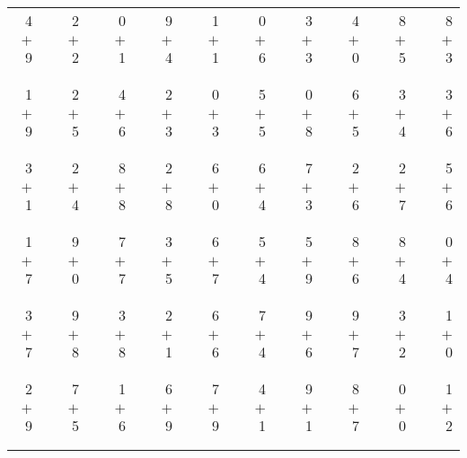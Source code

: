 \documentclass[12pt, letterpaper]{article}
\begin{document}
\begin{tabular}{rrrrrrrrrrrrrrrrrrr}
4 & & 2 & & 0 & & 9 & & 1 & & 0 & & 3 & & 4 & & 8 & & 8\\
$+$ 9 & & $+$ 2 & & $+$ 1 & & $+$ 4 & & $+$ 1 & & $+$ 6 & & $+$ 3 & & $+$ 0 & & $+$ 5 & & $+$ 3\\
\cline{1-1} \cline{3-3} \cline{5-5} \cline{7-7} \cline{9-9} \cline{11-11} \cline{13-13} \cline{15-15} \cline{17-17} \cline{19-19} \\ \\
1 & & 2 & & 4 & & 2 & & 0 & & 5 & & 0 & & 6 & & 3 & & 3\\
$+$ 9 & & $+$ 5 & & $+$ 6 & & $+$ 3 & & $+$ 3 & & $+$ 5 & & $+$ 8 & & $+$ 5 & & $+$ 4 & & $+$ 6\\
\cline{1-1} \cline{3-3} \cline{5-5} \cline{7-7} \cline{9-9} \cline{11-11} \cline{13-13} \cline{15-15} \cline{17-17} \cline{19-19} \\ \\
3 & & 2 & & 8 & & 2 & & 6 & & 6 & & 7 & & 2 & & 2 & & 5\\
$+$ 1 & & $+$ 4 & & $+$ 8 & & $+$ 8 & & $+$ 0 & & $+$ 4 & & $+$ 3 & & $+$ 6 & & $+$ 7 & & $+$ 6\\
\cline{1-1} \cline{3-3} \cline{5-5} \cline{7-7} \cline{9-9} \cline{11-11} \cline{13-13} \cline{15-15} \cline{17-17} \cline{19-19} \\ \\
1 & & 9 & & 7 & & 3 & & 6 & & 5 & & 5 & & 8 & & 8 & & 0\\
$+$ 7 & & $+$ 0 & & $+$ 7 & & $+$ 5 & & $+$ 7 & & $+$ 4 & & $+$ 9 & & $+$ 6 & & $+$ 4 & & $+$ 4\\
\cline{1-1} \cline{3-3} \cline{5-5} \cline{7-7} \cline{9-9} \cline{11-11} \cline{13-13} \cline{15-15} \cline{17-17} \cline{19-19} \\ \\
3 & & 9 & & 3 & & 2 & & 6 & & 7 & & 9 & & 9 & & 3 & & 1\\
$+$ 7 & & $+$ 8 & & $+$ 8 & & $+$ 1 & & $+$ 6 & & $+$ 4 & & $+$ 6 & & $+$ 7 & & $+$ 2 & & $+$ 0\\
\cline{1-1} \cline{3-3} \cline{5-5} \cline{7-7} \cline{9-9} \cline{11-11} \cline{13-13} \cline{15-15} \cline{17-17} \cline{19-19} \\ \\
2 & & 7 & & 1 & & 6 & & 7 & & 4 & & 9 & & 8 & & 0 & & 1\\
$+$ 9 & & $+$ 5 & & $+$ 6 & & $+$ 9 & & $+$ 9 & & $+$ 1 & & $+$ 1 & & $+$ 7 & & $+$ 0 & & $+$ 2\\
\cline{1-1} \cline{3-3} \cline{5-5} \cline{7-7} \cline{9-9} \cline{11-11} \cline{13-13} \cline{15-15} \cline{17-17} \cline{19-19} \\ \\

\end{tabular}
\end{document}
